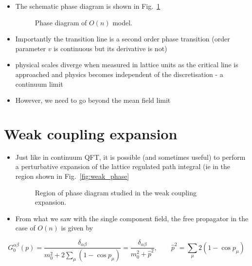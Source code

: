 \begin{itemize}
\item The schematic phase diagram is shown in  Fig.~\ref{fig:On_phase}
\begin{figure}
    \centering
    \caption{Phase diagram of $O(n)$ model.
    \label{fig:On_phase}}
\end{figure}


  \item Importantly the transition line is a second order phase transition (order parameter \(v\) is continuous but its derivative is not)
  \item physical scales diverge when measured in lattice units as the critical line is approached and physics becomes independent of the discretisation - a continuum limit
\item However, we need to go beyond the mean field limit\\
\end{itemize}



\section{Weak coupling expansion}

\begin{itemize}
  \item Just like in continuum QFT, it is possible (and sometimes useful) to perform a perturbative expansion of the lattice regulated path integral (ie in the region shown in Fig.~\ref{fig:weak_phase}
  \begin{figure}
      \centering
      \caption{Region of phase diagram studied in the weak coupling expansion.
      \label{ig:weak_phase}}
  \end{figure}
  \item From what we saw with the single component field, the free propagator in the case of $O(n)$ is given by
\end{itemize}

\begin{equation}
G_{0}^{\alpha \beta}(p)=\frac{\delta_{\alpha \beta}}{m_{0}^{2}+2 \sum_{\mu}\left(1-\cos p_{\mu}\right)}=\frac{\delta_{\alpha \beta}}{m_{0}^{2}+\hat{p}^{2}}, \qquad \hat{p}^{2}=\sum_{\mu} 2\left(1-\cos p_{\mu}\right)
\end{equation}

